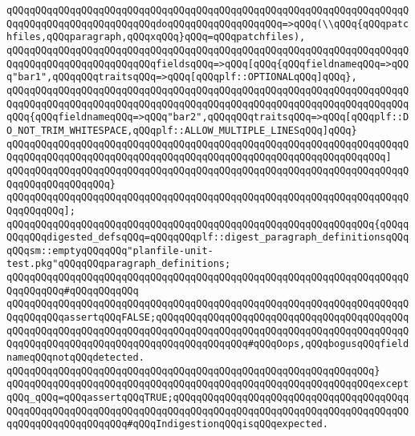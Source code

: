 \verb|qQQqqQQqqQQqqQQqqQQqqQQqqQQqqQQqqQQqqQQqqQQqqQQqqQQqqQQqqQQqqQQqqQQqqQQqqQQqqQQqqQQqqQQqqQQqqQQqdoqQQqqQQqqQQqqQQqqQQq=>qQQq(\\qQQq{qQQqpatchfiles,qQQqparagraph,qQQqxqQQq}qQQq=qQQqpatchfiles),|\newline
\verb|qQQqqQQqqQQqqQQqqQQqqQQqqQQqqQQqqQQqqQQqqQQqqQQqqQQqqQQqqQQqqQQqqQQqqQQqqQQqqQQqqQQqqQQqqQQqqQQqfieldsqQQq=>qQQq[qQQq{qQQqfieldnameqQQq=>qQQq"bar1",qQQqqQQqtraitsqQQq=>qQQq[qQQqplf::OPTIONALqQQq]qQQq},|\newline
\verb|qQQqqQQqqQQqqQQqqQQqqQQqqQQqqQQqqQQqqQQqqQQqqQQqqQQqqQQqqQQqqQQqqQQqqQQqqQQqqQQqqQQqqQQqqQQqqQQqqQQqqQQqqQQqqQQqqQQqqQQqqQQqqQQqqQQqqQQqqQQqqQQq{qQQqfieldnameqQQq=>qQQq"bar2",qQQqqQQqtraitsqQQq=>qQQq[qQQqplf::DO_NOT_TRIM_WHITESPACE,qQQqplf::ALLOW_MULTIPLE_LINESqQQq]qQQq}|\newline
\verb|qQQqqQQqqQQqqQQqqQQqqQQqqQQqqQQqqQQqqQQqqQQqqQQqqQQqqQQqqQQqqQQqqQQqqQQqqQQqqQQqqQQqqQQqqQQqqQQqqQQqqQQqqQQqqQQqqQQqqQQqqQQqqQQqqQQqqQQq]|\newline
\verb|qQQqqQQqqQQqqQQqqQQqqQQqqQQqqQQqqQQqqQQqqQQqqQQqqQQqqQQqqQQqqQQqqQQqqQQqqQQqqQQqqQQqqQQq}|\newline
\verb|qQQqqQQqqQQqqQQqqQQqqQQqqQQqqQQqqQQqqQQqqQQqqQQqqQQqqQQqqQQqqQQqqQQqqQQqqQQqqQQq];|\newline
\newline
\verb|qQQqqQQqqQQqqQQqqQQqqQQqqQQqqQQqqQQqqQQqqQQqqQQqqQQqqQQqqQQqqQQq{qQQqqQQqqQQqdigested_defsqQQq=qQQqqQQqplf::digest_paragraph_definitionsqQQqqQQqsm::emptyqQQqqQQq"planfile-unit-test.pkg"qQQqqQQqparagraph_definitions;|\newline
\verb|qQQqqQQqqQQqqQQqqQQqqQQqqQQqqQQqqQQqqQQqqQQqqQQqqQQqqQQqqQQqqQQqqQQqqQQqqQQqqQQq#qQQqqQQqqQQq|\newline
\verb|qQQqqQQqqQQqqQQqqQQqqQQqqQQqqQQqqQQqqQQqqQQqqQQqqQQqqQQqqQQqqQQqqQQqqQQqqQQqqQQqassertqQQqFALSE;qQQqqQQqqQQqqQQqqQQqqQQqqQQqqQQqqQQqqQQqqQQqqQQqqQQqqQQqqQQqqQQqqQQqqQQqqQQqqQQqqQQqqQQqqQQqqQQqqQQqqQQqqQQqqQQqqQQqqQQqqQQqqQQqqQQqqQQqqQQqqQQqqQQqqQQqqQQq#qQQqOops,qQQqbogusqQQqfieldnameqQQqnotqQQqdetected.|\newline
\verb|qQQqqQQqqQQqqQQqqQQqqQQqqQQqqQQqqQQqqQQqqQQqqQQqqQQqqQQqqQQqqQQq}|\newline
\verb|qQQqqQQqqQQqqQQqqQQqqQQqqQQqqQQqqQQqqQQqqQQqqQQqqQQqqQQqqQQqqQQqexceptqQQq_qQQq=qQQqassertqQQqTRUE;qQQqqQQqqQQqqQQqqQQqqQQqqQQqqQQqqQQqqQQqqQQqqQQqqQQqqQQqqQQqqQQqqQQqqQQqqQQqqQQqqQQqqQQqqQQqqQQqqQQqqQQqqQQqqQQqqQQqqQQqqQQqqQQqqQQq#qQQqIndigestionqQQqisqQQqexpected.|\newline
